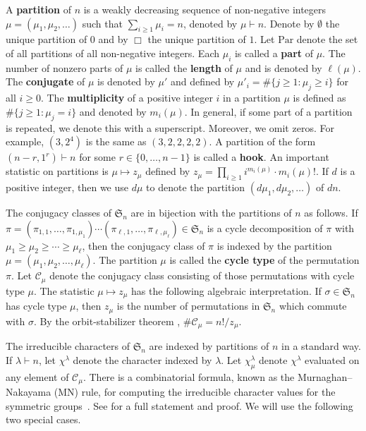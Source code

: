 \documentclass[10pt]{article}
\theoremstyle{definition}
\newcommand{\CC}{\mathcal{C}}
\newcommand{\FS}{\mathfrak{S}}
\newcommand{\myemph}{\textbf}
\newcommand{\Par}{\text{Par}}
\begin{document}
A \myemph{partition} of \(n\) is a weakly decreasing sequence of non-negative integers \(\mu = (\mu_1,\mu_2,\ldots)\) such that \(\sum_{i \geq 1} \mu_i = n\), denoted by \(\mu \vdash n\).
Denote by \(\emptyset\) the unique partition of \(0\) and by \(\Box\) the unique partition of \(1\).
Let \(\Par\) denote the set of all partitions of all non-negative integers.
Each \(\mu_i\) is called a \myemph{part} of \(\mu\).
The number of nonzero parts of \(\mu\) is called the \myemph{length} of \(\mu\) and is denoted by \(\ell(\mu)\).
The \myemph{conjugate} of \(\mu\) is denoted by \(\mu'\) and defined by \(\mu'_i = \# \{j \geq 1 : \mu_j \geq i\}\) for all \(i \geq 0\).
The \myemph{multiplicity} of a positive integer \(i\) in a partition \(\mu\) is defined as \(\# \{j \geq 1 : \mu_j = i \}\) and denoted by \(m_i (\mu)\).
In general, if some part of a partition is repeated, we denote this with a superscript.
Moreover, we omit zeros.
For example, \((3,2^4)\) is the same as \((3,2,2,2,2)\).
A partition of the form \((n-r,1^r) \vdash n\) for some \(r \in \{0,\ldots,n-1\}\) is called a \myemph{hook}.
An important statistic on partitions is \(\mu \mapsto z_\mu\) defined by \(z_\mu = \prod_{i \geq 1} i^{m_i(\mu)} \cdot m_i(\mu)!\).
If \(d\) is a positive integer, then we use \(d \mu\) to denote the partition \((d \mu_1, d \mu_2, \ldots )\) of \(dn\).

The conjugacy classes of \(\FS_n\) are in bijection with the partitions of \(n\) as follows.
If \(\pi = (\pi_{1,1},\ldots,\pi_{1,\mu_1}) \cdots (\pi_{\ell,1},\ldots,\pi_{\ell,\mu_\ell}) \in \FS_n\) is a cycle decomposition of $\pi$ with $\mu_1 \geq \mu_2 \geq \cdots \geq \mu_\ell$, then the conjugacy class of $\pi$ is indexed by the partition $\mu = (\mu_1,\mu_2,\ldots,\mu_\ell)$.
The partition \(\mu\) is called the \myemph{cycle type} of the permutation $\pi$.
Let $\CC_\mu$ denote the conjugacy class consisting of those permutations with cycle type $\mu$.
The statistic $\mu \mapsto z_\mu$ has the following algebraic interpretation.
If $\sigma \in \FS_n$ has cycle type $\mu$, then $z_\mu$ is the number of permutations in $\FS_n$ which commute with $\sigma$.
By the orbit-stabilizer theorem \cite[Proposition~4.3.6]{DF},
\(\# \CC_\mu = n! / z_\mu\).

The irreducible characters of \(\FS_n\) are indexed by partitions of \(n\) in a standard way.
If $\lambda \vdash n$, let $\chi^\lambda$ denote the character indexed by $\lambda$.
Let $\chi^\lambda_\mu$ denote $\chi^\lambda$ evaluated on any element of \(\CC_\mu\).
There is a combinatorial formula, known as the Murnaghan--Nakayama (MN) rule, for computing the irreducible character values for the symmetric groups~\cite{murnaghan, nakayama}. See \cite[Theorem~7.17.3]{EC2} for a full statement and proof.
We will use the following two special cases.
\end{document}
